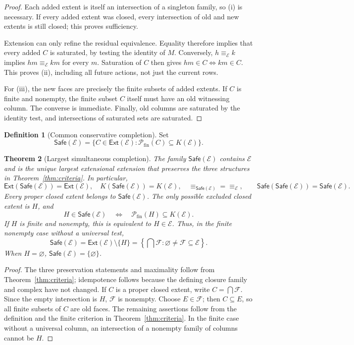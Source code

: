 \documentclass[11pt]{article}
\newtheorem{theorem}{Theorem}[section]
\theoremstyle{definition}
\newtheorem{definition}[theorem]{Definition}
\newcommand{\Fin}{\mathcal P_{\mathrm{fin}}}
\newcommand{\Ext}{\mathsf{Ext}}
\newcommand{\Safe}{\mathsf{Safe}}
\begin{document}
\begin{proof}
Each added extent is itself an intersection of a singleton family, so (i)
is necessary. If every added extent was closed, every intersection of old
and new extents is still closed; this proves sufficiency.

Extension can only refine the residual equivalence. Equality therefore
implies that every added $C$ is saturated, by testing the identity of $M$.
Conversely, $h\equiv_{\mathcal E}k$ implies $hm\equiv_{\mathcal E}km$ for
every $m$. Saturation of $C$ then gives $hm\in C\Leftrightarrow km\in C$.
This proves (ii), including all future actions, not just the current rows.

For (iii), the new faces are precisely the finite subsets of added
extents. If $C$ is finite and nonempty, the finite subset $C$
itself must have an old witnessing column. The converse is immediate.
Finally, old columns are saturated by the identity test, and intersections
of saturated sets are saturated.
\end{proof}

\begin{definition}[Common conservative completion]
Set
\[
 \Safe(\mathcal E)=
 \{C\in\Ext(\mathcal E):\Fin(C)\subseteq K(\mathcal E)\}.
\]
\end{definition}

\begin{theorem}[Largest simultaneous completion]\label{thm:maximal}
The family $\Safe(\mathcal E)$ contains $\mathcal E$ and is the unique
largest extensional extension that preserves the three structures in
Theorem~\ref{thm:criteria}. In particular,
\[
 \Ext(\Safe(\mathcal E))=\Ext(\mathcal E),\quad
 K(\Safe(\mathcal E))=K(\mathcal E),\quad
 \equiv_{\Safe(\mathcal E)}=\equiv_{\mathcal E},
 \qquad \Safe(\Safe(\mathcal E))=\Safe(\mathcal E).
\]
Every proper closed extent belongs to $\Safe(\mathcal E)$. The only
possible excluded closed extent is $H$, and
\[
 H\in\Safe(\mathcal E)\quad\Longleftrightarrow\quad
 \Fin(H)\subseteq K(\mathcal E).
\]
If $H$ is finite and nonempty, this is equivalent to $H\in\mathcal E$.
Thus, in the finite nonempty case without a universal test,
\[
 \Safe(\mathcal E)=\Ext(\mathcal E)\setminus\{H\}
 =\left\{\bigcap\mathcal F:\varnothing\ne\mathcal F\subseteq\mathcal E\right\}.
\]
When $H=\varnothing$, $\Safe(\mathcal E)=\{\varnothing\}$.
\end{theorem}

\begin{proof}
The three preservation statements and maximality follow from
Theorem~\ref{thm:criteria}; idempotence follows because the defining closure
family and complex have not changed. If $C$ is a proper closed extent,
write $C=\bigcap\mathcal F$. Since the empty intersection is $H$,
$\mathcal F$ is nonempty. Choose $E\in\mathcal F$; then $C\subseteq E$,
so all finite subsets of $C$ are old faces. The remaining assertions follow
from the definition and the finite criterion in Theorem~\ref{thm:criteria}.
In the finite case without a universal column, an intersection of a
nonempty family of columns cannot be $H$.
\end{proof}
\end{document}
